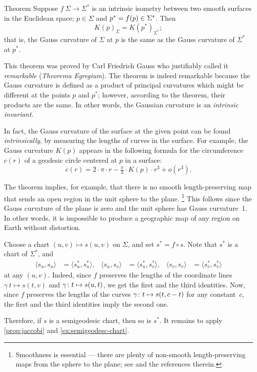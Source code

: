 \begin{thm}{Theorem}\label{thm:remarkable}
Suppose $f\:\Sigma\to \Sigma^{*}$ is an intrinsic isometry between two smooth surfaces in the Euclidean space; $p\in \Sigma$ and $p^{*}\z=f(p)\in \Sigma^{*}$.
Then 
\[K(p)_{\Sigma}=K(p^{*})_{\Sigma^{*}};\]
that is, the Gauss curvature of $\Sigma$ at $p$ is the same as the Gauss curvature of $\Sigma^{*}$ at $p^{*}$.
\end{thm}

This theorem was proved by Carl Friedrich Gauss \cite{gauss} who justifiably called it {}\emph{remarkable} ({}\emph{Theorema Egregium}).
The theorem is indeed remarkable because the Gauss curvature is defined as a product of principal curvatures which might be different at the points $p$ and $p^*$; however, according to the theorem, their products are the same.
In other words, the Gaussian curvature is an \textit{intrinsic invariant}.

In fact, the Gauss curvature of the surface at the given point can be found \textit{intrinsically},
by measuring the lengths of curves in the surface.
For example, the Gauss curvature $K(p)$ appears in the following formula for the circumference $c(r)$ of a geodesic circle centered at $p$ in a surface: 
\[c(r)=2\cdot\pi\cdot r-\tfrac\pi3\cdot K(p)\cdot r^3+o(r^3).\]

The theorem implies, for example, that there is no smooth length-preserving map that sends an open region in the unit sphere to the plane.%
\footnote{Smoothness is essential --- there are plenty of non-smooth length-preserving maps from the sphere to the plane; see \cite{petrunin-yashinski} and the references therein.}
This follows since the Gauss curvature of the plane is zero and the unit sphere has Gauss curvature~1. 
In other words, it is impossible to produce a geographic map of any region on Earth without distortion.

Choose a chart $(u,v)\mapsto s(u,v)$ on $\Sigma$, and set
$s^{*} =f\circ s$.
Note that $s^{*}$ is a chart of $\Sigma^{*}$, and 
\begin{align*}
\langle s_u,s_u\rangle
&=
\langle s_u^{*}, s_u^{*}\rangle,
&
\langle s_u, s_v\rangle
&=
\langle s_u^{*}, s_v^{*}\rangle,
&
\langle s_v, s_v\rangle
&=
\langle s_v^{*}, s_v^{*}\rangle
\end{align*}
at any $(u,v)$.
Indeed, since $f$ preserves the lengths of the coordinate lines $\gamma\:t\mapsto s(t,v)$ and  $\gamma\:t\z\mapsto s(u,t)$, we get the first and the third identities.
Now, since $f$ preserves the lengths of the curves $\gamma\:t\z\mapsto s(t,c-t)$ for any constant~$c$, the first and the third identities imply the second one.

Therefore, if $s$ is a semigeodesic chart, then so is $s^{*}$.
It remains to apply \ref{prop:jaccobi} and \ref{ex:semigeodesc-chart}.
\qeds
